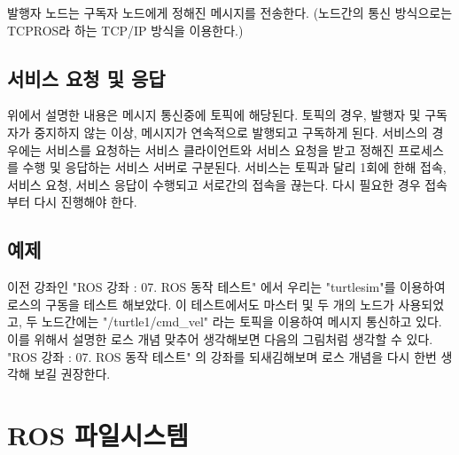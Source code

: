 발행자 노드는 구독자 노드에게 정해진 메시지를 전송한다. (노드간의 통신 방식으로는 TCPROS라 하는 TCP/IP 방식을 이용한다.)

\subsection{서비스 요청 및 응답}

위에서 설명한 내용은 메시지 통신중에 토픽에 해당된다. 토픽의 경우, 발행자 및 구독자가 중지하지 않는 이상, 메시지가 연속적으로 발행되고 구독하게 된다. 서비스의 경우에는 서비스를 요청하는 서비스 클라이언트와 서비스 요청을 받고 정해진 프로세스를 수행 및 응답하는 서비스 서버로 구분된다. 서비스는 토픽과 달리 1회에 한해 접속, 서비스 요청, 서비스 응답이 수행되고 서로간의 접속을 끊는다. 다시 필요한 경우 접속부터 다시 진행해야 한다. 

\subsection{예제}

이전 강좌인 "ROS 강좌 : 07. ROS 동작 테스트" 에서 우리는 "turtlesim"를 이용하여 로스의 구동을 테스트 해보았다. 이 테스트에서도 마스터 및 두 개의 노드가 사용되었고, 두 노드간에는 "/turtle1/cmd\_vel" 라는 토픽을 이용하여 메시지 통신하고 있다. 이를 위해서 설명한 로스 개념 맞추어 생각해보면 다음의 그림처럼 생각할 수 있다.  "ROS 강좌 : 07. ROS 동작 테스트" 의 강좌를 되새김해보며 로스 개념을 다시 한번 생각해 보길 권장한다.

\section{ROS 파일시스템}

